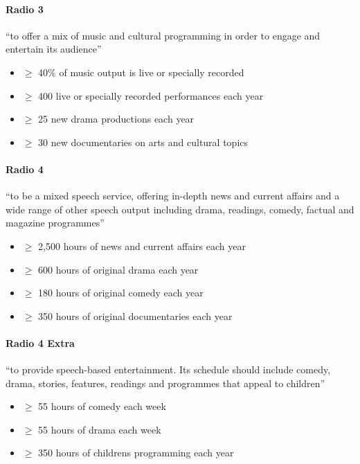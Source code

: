 \paragraph{Radio 3}
``to offer a mix of music and cultural programming in order to engage and
entertain its audience''

\begin{itemize}
  \item $\geq$ 40\% of music output is live or specially recorded
  \item $\geq$ 400 live or specially recorded performances each year
  \item $\geq$ 25 new drama productions each year
  \item $\geq$ 30 new documentaries on arts and cultural topics
\end{itemize}

\paragraph{Radio 4}
``to be a mixed speech service, offering in-depth news and current affairs and
a wide range of other speech output including drama, readings, comedy, factual
and magazine programmes''

\begin{itemize}
  \item $\geq$ 2,500 hours of news and current affairs each year
  \item $\geq$ 600 hours of original drama each year
  \item $\geq$ 180 hours of original comedy each year
  \item $\geq$ 350 hours of original documentaries each year
\end{itemize}

\paragraph{Radio 4 Extra}
``to provide speech-based entertainment. Its schedule should include comedy,
drama, stories, features, readings and programmes that appeal to children''

\begin{itemize}
  \item $\geq$ 55 hours of comedy each week
  \item $\geq$ 55 hours of drama each week
  \item $\geq$ 350 hours of childrens programming each year
\end{itemize}

